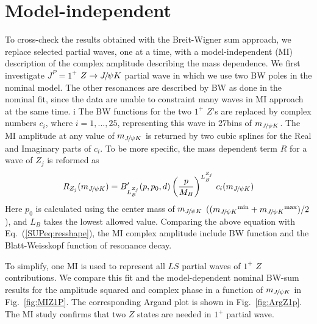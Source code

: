 \section{Model-independent}

\label{sec:app:MI}
To cross-check the results obtained with the Breit-Wigner sum approach, 
we replace selected partial waves, 
one at a time, 
with a model-independent (MI) description of the complex amplitude describing the mass dependence.
We first investigate $J^P=1^+$ $Z\rightarrow{\ensuremath{{J\mskip -3mu/\mskip -2mu\psi}}} K$ partial wave in which we use two BW poles in the nominal model.
The other resonances are described by BW as done in the nominal fit, 
since the data are unable to constraint many waves in MI approach at the same time. i
The BW functions for the two $1^+$ $Z$'s are replaced by complex numbers $c_i$,
where $i=1,...,25$, 
representing this wave in 27\mev bins of $m_{{{J\mskip -3mu/\mskip -2mu\psi}} K}$. 
The MI amplitude at any value of $m_{{{J\mskip -3mu/\mskip -2mu\psi}} K}$ is returned by two cubic splines for the Real and Imaginary parts of $c_i$. 
To be more specific, the mass dependent term $R$ for a wave of $Z_j$ is reformed as
\begin{equation}
R_{Z_j}(m_{{{J\mskip -3mu/\mskip -2mu\psi}} K}) =
B'_{L_{B}^{Z_j}}(p,p_0,d) \left(\frac{p}{M_{B}}\right)^{L_{B}^{Z_j}} \, c_i(m_{{{J\mskip -3mu/\mskip -2mu\psi}} K})
\label{SUPeq:resmi}
\end{equation}
Here $p_0$ is calculated using the center mass of $m_{{{J\mskip -3mu/\mskip -2mu\psi}} K}$ (\ie $({m_{{{J\mskip -3mu/\mskip -2mu\psi}} K}}^{\rm min}+{m_{{{J\mskip -3mu/\mskip -2mu\psi}} K}}^{\rm max})/2$), 
and $L_{B}$ takes the lowest allowed value. 
Comparing the above equation with Eq.~(\ref{SUPeq:resshape}), 
the MI complex amplitude include BW function and the Blatt-Weisskopf function of resonance decay.

To simplify, 
one MI is used to represent all $LS$ partial waves of $1^+$ $Z$ contributions. 
We compare this fit and the model-dependent nominal BW-sum results 
for the amplitude squared and complex phase in a function of $m_{{{J\mskip -3mu/\mskip -2mu\psi}} K}$ in Fig.~\ref{fig:MIZ1P}. 
The corresponding Argand plot is shown in Fig.~\ref{fig:ArgZ1p}. 
The MI study confirms that two $Z$ states are needed in $1^+$ partial wave.

